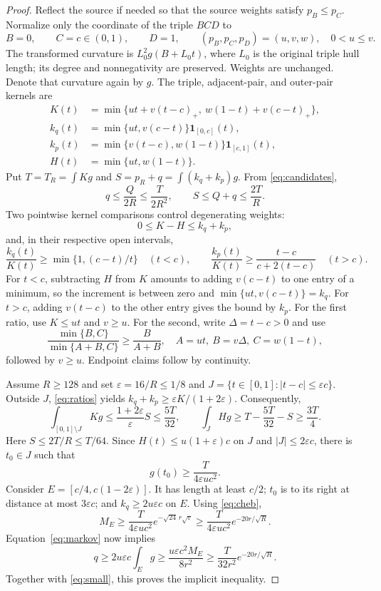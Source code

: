 \documentclass[11pt]{article}
\theoremstyle{remark}\newtheorem{remark}[theorem]{Remark}
\begin{document}
\begin{proof}
Reflect the source if needed so that the source weights satisfy
$p_B\le p_C$. Normalize only the coordinate of the triple $BCD$ to
\[
 B=0,\qquad C=c\in(0,1),\qquad D=1,
 \qquad (p_B,p_C,p_D)=(u,v,w),\quad 0<u\le v.
\]
The transformed curvature is $L_0^2g(B+L_0t)$, where $L_0$ is the
original triple hull length; its degree and nonnegativity are preserved.
Weights are unchanged. Denote that curvature again by $g$. The triple,
adjacent-pair, and outer-pair kernels are
\begin{align*}
 K(t)&=\min\{ut+v(t-c)_+,\ w(1-t)+v(c-t)_+\},\\
 k_q(t)&=\min\{ut,v(c-t)\}\mathbf1_{[0,c]}(t),\\
 k_p(t)&=\min\{v(t-c),w(1-t)\}\mathbf1_{[c,1]}(t),\\
 H(t)&=\min\{ut,w(1-t)\}.
\end{align*}
Put $T=T_R=\int Kg$ and $S=p_R+q=\int(k_q+k_p)g$. From
\eqref{eq:candidates},
\begin{equation}
 q\le\frac{Q}{2R}\le\frac{T}{2R^2},\qquad
 S\le Q+q\le\frac{2T}{R}.
 \label{eq:small}
\end{equation}
Two pointwise kernel comparisons control degenerating weights:
\begin{equation}
 0\le K-H\le k_q+k_p,
 \label{eq:H}
\end{equation}
and, in their respective open intervals,
\begin{equation}
 \frac{k_q(t)}{K(t)}\ge\min\{1,(c-t)/t\}\quad(t<c),
 \qquad
 \frac{k_p(t)}{K(t)}\ge\frac{t-c}{c+2(t-c)}\quad(t>c).
 \label{eq:ratios}
\end{equation}
For $t<c$, subtracting $H$ from $K$ amounts to adding $v(c-t)$ to one
entry of a minimum, so the increment is between zero and
$\min\{ut,v(c-t)\}=k_q$. For $t>c$, adding $v(t-c)$ to the other entry
gives the bound by $k_p$. For the first ratio, use $K\le ut$ and
$v\ge u$. For the second, write $\Delta=t-c>0$ and use
\[
 \frac{\min\{B,C\}}{\min\{A+B,C\}}\ge\frac{B}{A+B},
 \quad A=ut,\ B=v\Delta,\ C=w(1-t),
\]
followed by $v\ge u$. Endpoint claims follow by continuity.

Assume $R\ge128$ and set
$\varepsilon=16/R\le1/8$ and
$J=\{t\in[0,1]:|t-c|\le\varepsilon c\}$. Outside $J$,
\eqref{eq:ratios} yields
$k_q+k_p\ge\varepsilon K/(1+2\varepsilon)$. Consequently,
\[
 \int_{[0,1]\setminus J}Kg
 \le\frac{1+2\varepsilon}{\varepsilon}S
 \le\frac{5T}{32},\qquad
 \int_JHg\ge T-\frac{5T}{32}-S\ge\frac{3T}{4}.
\]
Here $S\le2T/R\le T/64$. Since
$H(t)\le u(1+\varepsilon)c$ on $J$ and $|J|\le2\varepsilon c$,
there is $t_0\in J$ such that
\[
 g(t_0)\ge\frac{T}{4\varepsilon u c^2}.
\]
Consider $E=[c/4,c(1-2\varepsilon)]$. It has length at least $c/2$;
$t_0$ is to its right at distance at most $3\varepsilon c$; and
$k_q\ge2u\varepsilon c$ on $E$. Using \eqref{eq:cheb},
\[
 M_E\ge\frac{T}{4\varepsilon u c^2}
 e^{-\sqrt{24}\,r\sqrt\varepsilon}
 \ge\frac{T}{4\varepsilon u c^2}e^{-20r/\sqrt R}.
\]
Equation~\eqref{eq:markov} now implies
\[
 q\ge2u\varepsilon c\int_Eg
 \ge\frac{u\varepsilon c^2M_E}{8r^2}
 \ge\frac{T}{32r^2}e^{-20r/\sqrt R}.
\]
Together with \eqref{eq:small}, this proves the implicit inequality.


\end{proof}
\end{document}
